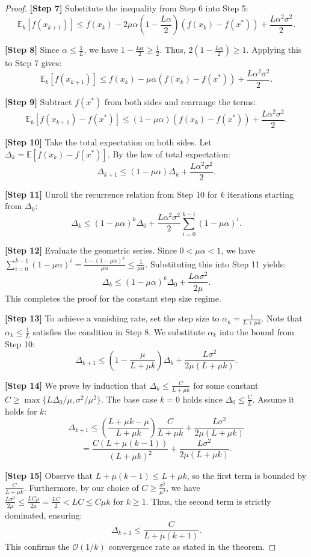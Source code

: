\documentclass[11pt]{article}
\begin{document}
\begin{proof}
\textbf{[Step 7]} Substitute the inequality from Step 6 into Step 5:
\[ \mathbb{E}_k[f(x_{k+1})] \le f(x_k) - 2 \mu \alpha \left( 1 - \frac{L \alpha}{2} \right) (f(x_k) - f(x^*)) + \frac{L \alpha^2 \sigma^2}{2}. \]

\textbf{[Step 8]} Since $\alpha \le \frac{1}{L}$, we have $1 - \frac{L \alpha}{2} \ge \frac{1}{2}$. Thus, $2 \left( 1 - \frac{L \alpha}{2} \right) \ge 1$. Applying this to Step 7 gives:
\[ \mathbb{E}_k[f(x_{k+1})] \le f(x_k) - \mu \alpha (f(x_k) - f(x^*)) + \frac{L \alpha^2 \sigma^2}{2}. \]

\textbf{[Step 9]} Subtract $f(x^*)$ from both sides and rearrange the terms:
\[ \mathbb{E}_k[f(x_{k+1}) - f(x^*)] \le (1 - \mu \alpha)(f(x_k) - f(x^*)) + \frac{L \alpha^2 \sigma^2}{2}. \]

\textbf{[Step 10]} Take the total expectation on both sides. Let $\Delta_k = \mathbb{E}[f(x_k) - f(x^*)]$. By the law of total expectation:
\[ \Delta_{k+1} \le (1 - \mu \alpha) \Delta_k + \frac{L \alpha^2 \sigma^2}{2}. \]

\textbf{[Step 11]} Unroll the recurrence relation from Step 10 for $k$ iterations starting from $\Delta_0$:
\[ \Delta_k \le (1 - \mu \alpha)^k \Delta_0 + \frac{L \alpha^2 \sigma^2}{2} \sum_{i=0}^{k-1} (1 - \mu \alpha)^i. \]

\textbf{[Step 12]} Evaluate the geometric series. Since $0 < \mu \alpha < 1$, we have $\sum_{i=0}^{k-1} (1 - \mu \alpha)^i = \frac{1 - (1 - \mu \alpha)^k}{\mu \alpha} \le \frac{1}{\mu \alpha}$. Substituting this into Step 11 yields:
\[ \Delta_k \le (1 - \mu \alpha)^k \Delta_0 + \frac{L \alpha \sigma^2}{2 \mu}. \]
This completes the proof for the constant step size regime.

\textbf{[Step 13]} To achieve a vanishing rate, set the step size to $\alpha_k = \frac{1}{L + \mu k}$. Note that $\alpha_k \le \frac{1}{L}$ satisfies the condition in Step 8. We substitute $\alpha_k$ into the bound from Step 10:
\[ \Delta_{k+1} \le \left(1 - \frac{\mu}{L + \mu k}\right) \Delta_k + \frac{L \sigma^2}{2 \mu (L + \mu k)}. \]

\textbf{[Step 14]} We prove by induction that $\Delta_k \le \frac{C}{L + \mu k}$ for some constant $C \ge \max\{L \Delta_0 / \mu, \sigma^2 / \mu^2\}$. The base case $k=0$ holds since $\Delta_0 \le \frac{C}{L}$. Assume it holds for $k$:
\[ \Delta_{k+1} \le \left(\frac{L + \mu k - \mu}{L + \mu k}\right) \frac{C}{L + \mu k} + \frac{L \sigma^2}{2 \mu (L + \mu k)} \]
\[ = \frac{C(L + \mu(k-1))}{(L + \mu k)^2} + \frac{L \sigma^2}{2 \mu (L + \mu k)}. \]

\textbf{[Step 15]} Observe that $L + \mu(k-1) \le L + \mu k$, so the first term is bounded by $\frac{C}{L + \mu k}$. Furthermore, by our choice of $C \ge \frac{\sigma^2}{\mu^2}$, we have $\frac{L \sigma^2}{2 \mu} \le \frac{L C \mu}{2 \mu} = \frac{LC}{2} < LC \le C \mu k$ for $k \ge 1$. Thus, the second term is strictly dominated, ensuring:
\[ \Delta_{k+1} \le \frac{C}{L + \mu(k+1)}. \]
This confirms the $\mathcal{O}(1/k)$ convergence rate as stated in the theorem.
\end{proof}
\end{document}

